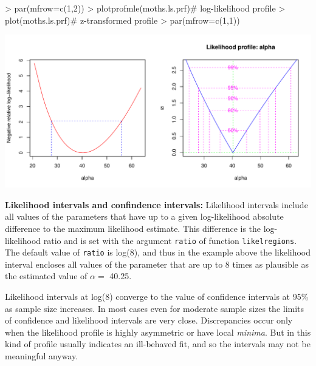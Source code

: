 \documentclass[11pt, A4]{article}
\newcommand{\code}[1]{\texttt{#1}}
\begin{document}
\begin{Schunk}
\begin{Sinput}
> par(mfrow=c(1,2))
> plotprofmle(moths.ls.prf)# log-likelihood profile
> plot(moths.ls.prf)# z-transformed profile
> par(mfrow=c(1,1))
\end{Sinput}
\end{Schunk}
\includegraphics{sads_intro-woven-Ploting-profiles}

\begin{shaded}
  \textbf{Likelihood intervals and confindence intervals:} \hfill
  Likelihood intervals include all values of the parameters that have up to a given 
  log-likelihood absolute difference to the maximum likelihood estimate.
  This difference is the log-likelihood ratio and is set with the argument \code{ratio} 
  of function \code{likelregions}. The default value of \code{ratio} is log(8), and thus
  in the example above the likelihood interval encloses all values of the parameter 
  that are up to 8 times as plausible
  as the estimated value of $\alpha = $ 40.25.
  
  Likelihood intervals at log(8) converge to the value of confidence intervals at 95\%
  as sample size increases. In most cases even for moderate sample sizes the limits of
  confidence and likelihood intervals are very close. Discrepancies occur only when the likelihood profile
  is highly asymmetric or have local {\em minima}. But in this kind of profile usually indicates an ill-behaved
  fit, and so the intervals may not be meaningful anyway.
\end{shaded}
\end{document}
